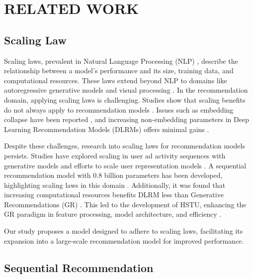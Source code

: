 \section{RELATED WORK}

\subsection{Scaling Law}

Scaling laws, prevalent in Natural Language Processing (NLP) \cite{gpt3, achiam2023gpt4, kaplan2020scaling, yin2024entropy}, describe the relationship between a model's performance and its size, training data, and computational resources. These laws extend beyond NLP to domains like autoregressive generative models \cite{henighan2020scaling} and visual processing \cite{zhai2022scaling, yang2023lever, yang2024exploring, penglive,  li2024configure}. In the recommendation domain, applying scaling laws is challenging. Studies show that scaling benefits do not always apply to recommendation models \cite{guo2023embedding, ardalani2022understanding}. Issues such as embedding collapse have been reported \cite{guo2023embedding}, and increasing non-embedding parameters in Deep Learning Recommendation Models (DLRMs) offers minimal gains \cite{ardalani2022understanding}.

Despite these challenges, research into scaling laws for recommendation models persists. Studies have explored scaling in user ad activity sequences with generative models \cite{chitlangia2023scaling} and efforts to scale user representation models \cite{shin2023scaling}. A sequential recommendation model with 0.8 billion parameters has been developed, highlighting scaling laws in this domain \cite{zhang2023scaling}. Additionally, it was found that increasing computational resources benefits DLRM less than Generative Recommendations (GR) \cite{zhai2024actions}. This led to the development of HSTU, enhancing the GR paradigm in feature processing, model architecture, and efficiency \cite{zhai2024actions}. 

Our study proposes a model designed to adhere to scaling laws, facilitating its expansion into a large-scale recommendation model for improved performance.

\subsection{Sequential Recommendation}

